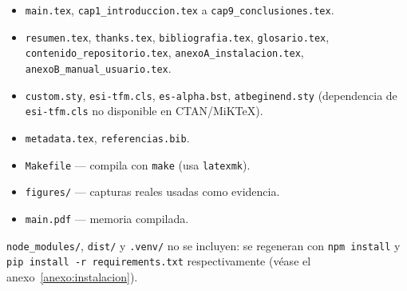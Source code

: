 \begin{itemize}
\begin{itemize}
  \item \texttt{main.tex}, \texttt{cap1\_introduccion.tex} a
    \texttt{cap9\_conclusiones.tex}.
  \item \texttt{resumen.tex}, \texttt{thanks.tex}, \texttt{bibliografia.tex},
    \texttt{glosario.tex}, \texttt{contenido\_repositorio.tex},
    \texttt{anexoA\_instalacion.tex}, \texttt{anexoB\_manual\_usuario.tex}.
  \item \texttt{custom.sty}, \texttt{esi-tfm.cls}, \texttt{es-alpha.bst},
    \texttt{atbeginend.sty} (dependencia de \texttt{esi-tfm.cls} no
    disponible en CTAN/MiKTeX).
  \item \texttt{metadata.tex}, \texttt{referencias.bib}.
  \item \texttt{Makefile} — compila con \texttt{make} (usa
    \texttt{latexmk}).
  \item \texttt{figures/} — capturas reales usadas como evidencia.
  \item \texttt{main.pdf} — memoria compilada.
  \end{itemize}
\end{itemize}

\texttt{node\_modules/}, \texttt{dist/} y \texttt{.venv/} no se incluyen: se
regeneran con \texttt{npm install} y \texttt{pip install -r requirements.txt}
respectivamente (véase el anexo~\ref{anexo:instalacion}).